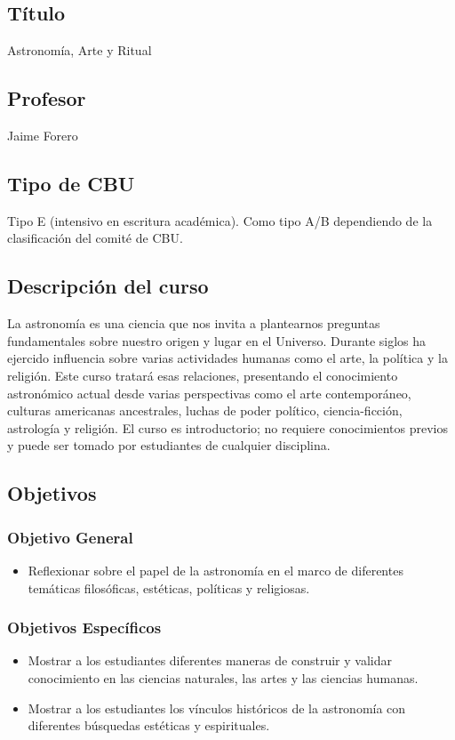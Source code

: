 \documentclass{report}
\begin{document}
\subsection*{\bf T\'itulo}
Astronom\'ia, Arte y Ritual\\

\subsection*{\bf Profesor}
Jaime Forero\\

\subsection*{Tipo de CBU}
Tipo E (intensivo en escritura acad\'emica). Como tipo
A/B dependiendo de la clasificaci\'on del comit\'e de CBU.  

\subsection*{Descripci\'on del curso}
La astronom\'ia es una ciencia que nos invita a plantearnos preguntas
fundamentales sobre nuestro origen y lugar en el Universo. Durante
siglos ha ejercido influencia sobre varias actividades humanas como el arte, la
pol\'itica y la religi\'on. Este curso tratar\'a esas relaciones,
presentando el conocimiento astron\'omico actual desde varias
perspectivas como el arte contempor\'aneo, culturas americanas
ancestrales, luchas de poder pol\'itico, ciencia-ficci\'on,
astrolog\'ia y religi\'on. El curso es introductorio; no requiere
conocimientos previos y puede ser tomado por estudiantes de cualquier
disciplina. 
\subsection*{Objetivos}

\subsubsection*{Objetivo General}
\begin{itemize}
\item Reflexionar sobre el papel de la astronom\'ia en el marco de 
  diferentes tem\'aticas filos\'oficas, est\'eticas, pol\'iticas y
  religiosas.
\end{itemize}

\subsubsection*{Objetivos Espec\'ificos}
\begin{itemize}
\item Mostrar a los estudiantes diferentes maneras de construir
  y validar conocimiento en las ciencias naturales, las artes y las
  ciencias humanas. 
\item Mostrar a los estudiantes los v\'inculos hist\'oricos de la
  astronom\'ia con diferentes b\'usquedas est\'eticas y espirituales.  
\end{itemize}
\end{document}
